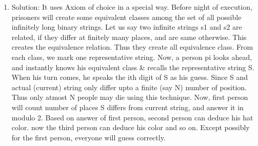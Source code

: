 \begin{enumerate}

\item
Solution: It uses Axiom of choice in a special way. Before night of execution, prisoners will create some equivalent classes among the set of all possible infinitely long binary strings. Let us say two infinite strings s1 and s2 are related, if they differ at finitely many places, and are same otherwise. This creates the equivalence relation. Thus they create all equivalence class. From each class, we mark one representative string.
Now, a person pi looks ahead, and instantly knows his equivalent class \& recalls the representative string S. When his turn comes, he speaks the ith digit of S as his guess. Since S and actual (current) string only differ upto a finite (say N) number of position. Thus only atmost N people may die using this technique.
Now, first person will count number of places S differs from current string, and answer it in modulo 2. Based on answer of first person, second person can deduce his hat color. now the third person can deduce his color and so on. Except possibly for the first person, everyone will guess correctly.



\end{enumerate}